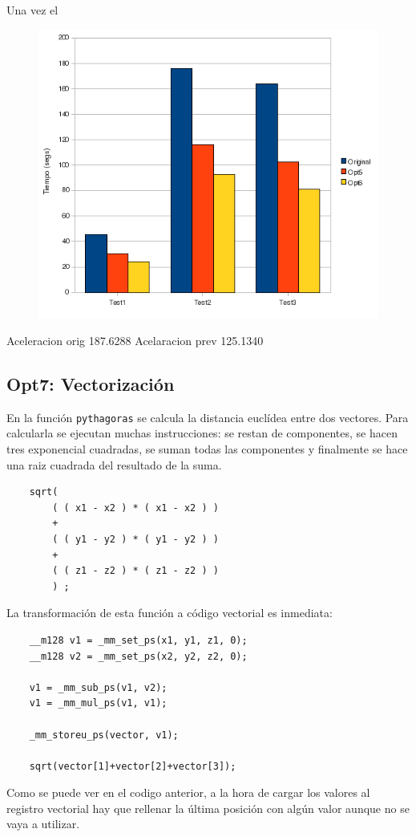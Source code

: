 Una vez el 

\begin{figure}[ht]
   \centering
   \includegraphics[keepaspectratio=true,width=.6\textwidth]{figures/opt6-perf}
\end{figure}

Aceleracion orig	187.6288%
Acelaracion prev	125.1340%

\subsection{Opt7: Vectorizaci\'{o}n}

En la funci\'{o}n \texttt{pythagoras} se calcula la distancia eucl\'{i}dea
entre dos vectores. Para calcularla se ejecutan muchas instrucciones: se restan
de componentes, se hacen tres exponencial cuadradas, se suman todas las
componentes y finalmente se hace una raiz cuadrada del resultado de la suma.

\begin{lstlisting}
	sqrt( 
		( ( x1 - x2 ) * ( x1 - x2 ) ) 
		+ 
		( ( y1 - y2 ) * ( y1 - y2 ) ) 
		+ 
		( ( z1 - z2 ) * ( z1 - z2 ) ) 
		) ;
\end{lstlisting}

La transformaci\'{o}n de esta funci\'{o}n a c\'{o}digo vectorial es inmediata:

\begin{lstlisting}
	__m128 v1 = _mm_set_ps(x1, y1, z1, 0);
	__m128 v2 = _mm_set_ps(x2, y2, z2, 0);
	
	v1 = _mm_sub_ps(v1, v2);
	v1 = _mm_mul_ps(v1, v1);
	
	_mm_storeu_ps(vector, v1);
	
	sqrt(vector[1]+vector[2]+vector[3]);
\end{lstlisting}

Como se puede ver en el codigo anterior, a la hora de cargar los valores al
registro vectorial hay que rellenar la \'{u}ltima posici\'{o}n con alg\'{u}n
valor aunque no se vaya a utilizar.

